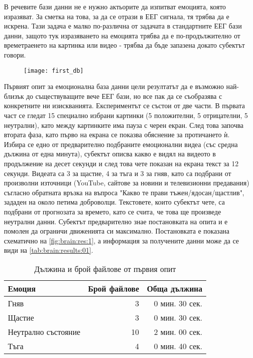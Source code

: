 \documentclass[main.tex]{subfiles}
\begin{document}
В речевите бази данни не е нужно актьорите да изпитват емоцията, която изразяват. За сметка на това, за да се отрази в ЕЕГ сигнала, тя трябва да е искрена. Тази задача е малко по-различна от задачата в стандартните ЕЕГ бази данни, защото тук изразяването на емоцията трябва да е по-продължително от времетраенето на картинка или видео - трябва да бъде запазена докато субектът говори.

\begin{figure}[ht]%
    \texttt{[image: first\_db]}%
    \caption{}
    \label{fig:brain:res:1}
\end{figure}

Първият опит за емоционална база данни цели резултатът да е възможно най-близък до съществуващите вече ЕЕГ бази, но все пак да се съобразява с конкретните ни изискванията. Експериментът се състои от две части.
В първата част се гледат 15 специално избрани картинки (5 положителни, 5 отрицателни, 5 неутрални), като между картинките има пауза с черен екран. След това започва втората фаза, като първо на екрана се показва обяснение за протичането ѝ. Избира се едно от предварително подбраните емоционални видеа (със средна дължина от една минута), субектът описва какво е видял на видеото в продължение на десет секунди и след това чете показан на екрана текст за 12 секунди.
Видеата са 3 за щастие, 4 за тъга и 3 за гняв, като са подбрани от произволни източници (YouTube, сайтове за новини и телевизионни предавания) съгласно обратната връзка на въпроса "Какво те прави тъжен/ядосан/щастлив", зададен на около петима доброволци. Текстовете, които субектът чете, са подбрани от прогнозата за времето, като се счита, че това ще произведе неутрални данни.
Субектът предварително знае постановката на опита и е помолен да ограничи движенията си максимално. Постановката е показана схематично на \autoref{fig:brain:res:1}, а информация за получените данни може да се види на \autoref{tab:brain:results:01}.

\begin{table}[h]
    \begin{center}
    \begin{tabular}{|l|r|r|} 
        \hline
        Емоция & Брой файлове & Обща дължина\\ 
        \hline
        Гняв & 3 & 0 мин. 30 сек.\\ 
        Щастие & 3 & 0 мин. 30 сек.\\ 
        Неутрално състояние & 10 & 2 мин. 00 сек. \\ 
        Тъга & 4 & 0 мин. 40 сек. \\ 
        \hline
    \end{tabular}
    \caption{Дължина и брой файлове от първия опит}
    \label{tab:brain:results:01}
    \end{center}
\end{table}
\end{document}
